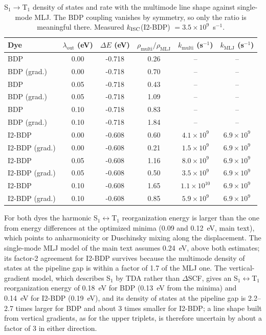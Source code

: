 \begin{table}[h]\centering\small
\caption{S$_1\to$T$_1$ density of states and rate with the multimode line shape against single-mode MLJ. The BDP coupling vanishes by symmetry, so only the ratio is meaningful there. Measured $k_\mathrm{ISC}$(I2-BDP) $=3.5\times10^{9}$~s$^{-1}$.}
\begin{tabular}{lccccc}\hline
Dye & $\lambda_\mathrm{out}$ (eV) & $\Delta E$ (eV) & $\rho_\mathrm{multi}/\rho_\mathrm{MLJ}$ & $k_\mathrm{multi}$ (s$^{-1}$) & $k_\mathrm{MLJ}$ (s$^{-1}$) \\ \hline
BDP & 0.00 & -0.718 & 0.26 & -- & -- \\
BDP (grad.) & 0.00 & -0.718 & 0.70 & -- & -- \\
BDP & 0.05 & -0.718 & 0.43 & -- & -- \\
BDP (grad.) & 0.05 & -0.718 & 1.09 & -- & -- \\
BDP & 0.10 & -0.718 & 0.83 & -- & -- \\
BDP (grad.) & 0.10 & -0.718 & 1.84 & -- & -- \\
I2-BDP & 0.00 & -0.608 & 0.60 & $4.1\times10^{9}$ & $6.9\times10^{9}$ \\
I2-BDP (grad.) & 0.00 & -0.608 & 0.21 & $1.5\times10^{9}$ & $6.9\times10^{9}$ \\
I2-BDP & 0.05 & -0.608 & 1.16 & $8.0\times10^{9}$ & $6.9\times10^{9}$ \\
I2-BDP (grad.) & 0.05 & -0.608 & 0.50 & $3.5\times10^{9}$ & $6.9\times10^{9}$ \\
I2-BDP & 0.10 & -0.608 & 1.65 & $1.1\times10^{10}$ & $6.9\times10^{9}$ \\
I2-BDP (grad.) & 0.10 & -0.608 & 0.85 & $5.9\times10^{9}$ & $6.9\times10^{9}$ \\
\hline\end{tabular}\end{table}

For both dyes the harmonic S$_1\leftrightarrow$T$_1$ reorganization energy is larger than the one from energy differences at the optimized minima (0.09 and 0.12~eV, main text), which points to anharmonicity or Duschinsky mixing along the displacement. The single-mode MLJ model of the main text assumes 0.24~eV, above both estimates; its factor-2 agreement for I2-BDP survives because the multimode density of states at the pipeline gap is within a factor of 1.7 of the MLJ one. The vertical-gradient model, which describes S$_1$ by TDA rather than $\Delta$SCF, gives an S$_1\leftrightarrow$T$_1$ reorganization energy of 0.18~eV for BDP (0.13~eV from the minima) and 0.14~eV for I2-BDP (0.19~eV), and its density of states at the pipeline gap is 2.2--2.7 times larger for BDP and about 3 times smaller for I2-BDP; a line shape built from vertical gradients, as for the upper triplets, is therefore uncertain by about a factor of 3 in either direction.

